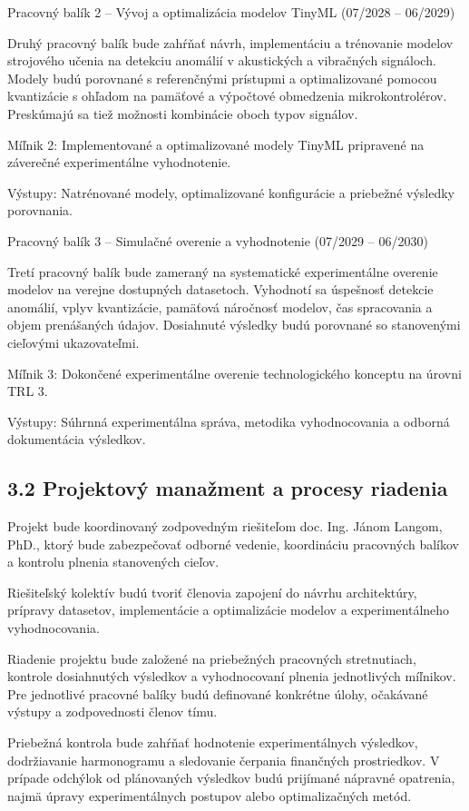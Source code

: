 \documentclass[10pt,a4paper]{article}
\begin{document}
Pracovný balík 2 – Vývoj a optimalizácia modelov TinyML (07/2028 – 06/2029)

Druhý pracovný balík bude zahŕňať návrh, implementáciu a trénovanie modelov strojového učenia na detekciu anomálií v akustických a vibračných signáloch. Modely budú porovnané s referenčnými prístupmi a optimalizované pomocou kvantizácie s ohľadom na pamäťové a výpočtové obmedzenia mikrokontrolérov. Preskúmajú sa tiež možnosti kombinácie oboch typov signálov.

Míľnik 2: Implementované a optimalizované modely TinyML pripravené na záverečné experimentálne vyhodnotenie.

Výstupy: Natrénované modely, optimalizované konfigurácie a priebežné výsledky porovnania.

Pracovný balík 3 – Simulačné overenie a vyhodnotenie (07/2029 – 06/2030)

Tretí pracovný balík bude zameraný na systematické experimentálne overenie modelov na verejne dostupných datasetoch. Vyhodnotí sa úspešnosť detekcie anomálií, vplyv kvantizácie, pamäťová náročnosť modelov, čas spracovania a objem prenášaných údajov. Dosiahnuté výsledky budú porovnané so stanovenými cieľovými ukazovateľmi.

Míľnik 3: Dokončené experimentálne overenie technologického konceptu na úrovni TRL 3.

Výstupy: Súhrnná experimentálna správa, metodika vyhodnocovania a odborná dokumentácia výsledkov.

\subsection*{3.2 Projektový manažment
a procesy riadenia}

Projekt bude koordinovaný zodpovedným riešiteľom doc. Ing. Jánom Langom, PhD., ktorý bude zabezpečovať odborné vedenie, koordináciu pracovných balíkov a kontrolu plnenia stanovených cieľov.

Riešiteľský kolektív budú tvoriť členovia zapojení do návrhu architektúry, prípravy datasetov, implementácie a optimalizácie modelov a experimentálneho vyhodnocovania.

Riadenie projektu bude založené na priebežných pracovných stretnutiach, kontrole dosiahnutých výsledkov a vyhodnocovaní plnenia jednotlivých míľnikov. Pre jednotlivé pracovné balíky budú definované konkrétne úlohy, očakávané výstupy a zodpovednosti členov tímu.

Priebežná kontrola bude zahŕňať hodnotenie experimentálnych výsledkov, dodržiavanie harmonogramu a sledovanie čerpania finančných prostriedkov. V prípade odchýlok od plánovaných výsledkov budú prijímané nápravné opatrenia, najmä úpravy experimentálnych postupov alebo optimalizačných metód.
\end{document}
